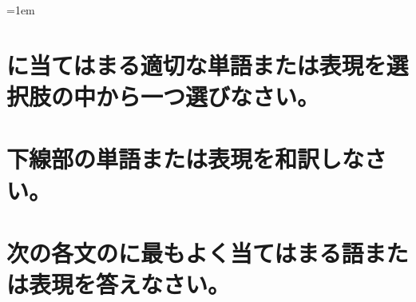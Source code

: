 \documentclass[a4paper]{ltjsarticle}
\begin{document}
\leftskip=1em

\section{\blank に当てはまる適切な単語または表現を選択肢の中から一つ選びなさい。}

\section{下線部の単語または表現を和訳しなさい。}

\section{次の各文の\blank に最もよく当てはまる語または表現を答えなさい。}
\addtocounter{correct}{-1}
\end{document}

